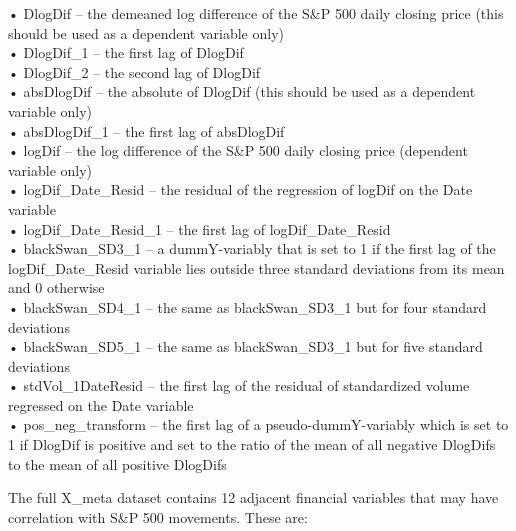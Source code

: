 \documentclass[11pt,preprint, authoryear]{elsarticle}
\numberwithin{equation}{section}
\numberwithin{figure}{section}
\numberwithin{table}{section}
\begin{document}
• DlogDif -- the demeaned log difference of the S\&P 500 daily closing
price (this should be used as a dependent variable only)\\
• DlogDif\_1 -- the first lag of DlogDif\\
• DlogDif\_2 -- the second lag of DlogDif\\
• absDlogDif -- the absolute of DlogDif (this should be used as a
dependent variable only)\\
• absDlogDif\_1 -- the first lag of absDlogDif\\
• logDif -- the log difference of the S\&P 500 daily closing price
(dependent variable only)\\
• logDif\_Date\_Resid -- the residual of the regression of logDif on the
Date variable\\
• logDif\_Date\_Resid\_1 -- the first lag of logDif\_Date\_Resid\\
• blackSwan\_SD3\_1 -- a dummY-variably that is set to 1 if the first
lag of the logDif\_Date\_Resid variable lies outside three standard
deviations from its mean and 0 otherwise\\
• blackSwan\_SD4\_1 -- the same as blackSwan\_SD3\_1 but for four
standard deviations\\
• blackSwan\_SD5\_1 -- the same as blackSwan\_SD3\_1 but for five
standard deviations\\
• stdVol\_1DateResid -- the first lag of the residual of standardized
volume regressed on the Date variable\\
• pos\_neg\_transform -- the first lag of a pseudo-dummY-variably which
is set to 1 if DlogDif is positive and set to the ratio of the mean of
all negative DlogDifs to the mean of all positive DlogDifs

The full X\_meta dataset contains 12 adjacent financial variables that
may have correlation with S\&P 500 movements. These are:
\end{document}
